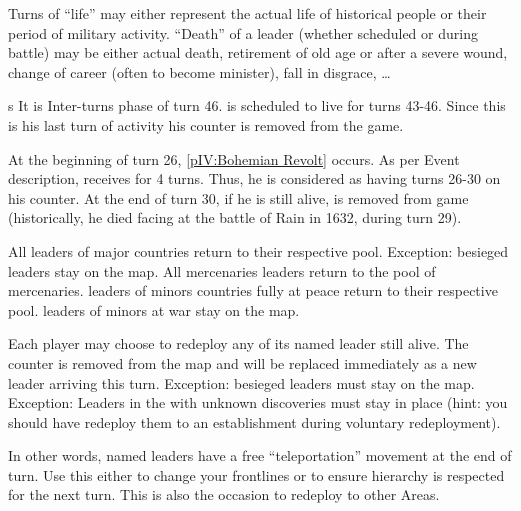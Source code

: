 \begin{designnote}
  Turns of ``life'' may either represent the actual life of historical people
  or their period of military activity. ``Death'' of a leader (whether
  scheduled or during battle) may be either actual death, retirement of old
  age or after a severe wound, change of career (often to become minister),
  fall in disgrace, \ldots
\end{designnote}

\begin{exemple}s
  It is Inter-turns phase of turn 46.  is
  scheduled to live for turns 43-46. Since this is his last turn of activity
  his counter is removed from the game.

  \smallskip

  At the beginning of turn 26, \ref{pIV:Bohemian Revolt} occurs. As per Event
  description, \paysBaviere receives  for 4 turns. Thus,
  he is considered as having turns 26-30 on his counter. At the end of turn
  30, if he is still alive, \leaderTilly is removed from game (historically,
  he died facing  at the battle of Rain in 1632, during
  turn 29).
\end{exemple}

\aparag[Anonymous]
\bparag All \anonyme leaders of major countries return to their respective
pool.
\bparag Exception: besieged leaders stay on the map.
\bparag All mercenaries leaders return to the pool of mercenaries.
\bparag \anonyme leaders of minors countries fully at peace return to their
respective pool.
\bparag \anonyme leaders of minors at war stay on the map.

Each player may choose to redeploy any of its named leader still alive. The
counter is removed from the map and will be replaced immediately as a new
leader arriving this turn.
\bparag Exception: besieged leaders must stay on the map.
\bparag Exception: Leaders in the \ROTW with unknown discoveries must stay in
place (hint: you should have redeploy them to an establishment during
voluntary redeployment).

\begin{playtip}
  In other words, named leaders have a free ``teleportation'' movement at the
  end of turn. Use this either to change your frontlines or to ensure
  hierarchy is respected for the next turn. This is also the occasion to
  redeploy \LeaderGov to other Areas.
\end{playtip}

